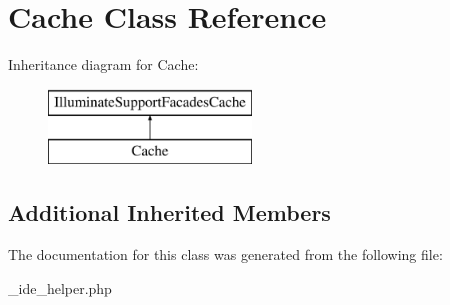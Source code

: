 \hypertarget{class_cache}{}\section{Cache Class Reference}
\label{class_cache}
Inheritance diagram for Cache\+:\begin{figure}[H]
\begin{center}
\leavevmode
\includegraphics[height=2.000000cm]{class_cache}
\end{center}
\end{figure}
\subsection*{Additional Inherited Members}


The documentation for this class was generated from the following file\+:\begin{DoxyCompactItemize}
\item 
\+\_\+ide\+\_\+helper.\+php\end{DoxyCompactItemize}
